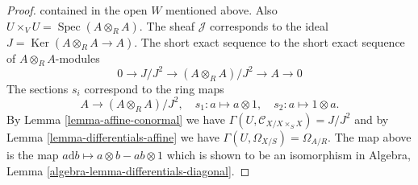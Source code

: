 \documentclass[10pt,a4paper]{amsart}
\theoremstyle{plain}
\theoremstyle{definition}
\theoremstyle{remark}
\numberwithin{equation}{subsection}
\def\Spec{\mathop{\mathrm{Spec}}}
\def\Ker{\mathop{\mathrm{Ker}}}
\begin{document}
\begin{proof}
contained in the open $W$ mentioned above. Also
$U \times_V U = \Spec(A \otimes_R A)$.
The sheaf $\mathcal{J}$ corresponds to the ideal
$J = \Ker(A \otimes_R A \to A)$.
The short exact sequence to the short exact sequence
of $A \otimes_R A$-modules
$$
0 \to J/J^2 \to (A \otimes_R A)/J^2 \to A \to 0
$$
The sections $s_i$ correspond to the ring maps
$$
A \longrightarrow (A \otimes_R A)/J^2,\quad
s_1 : a \mapsto a \otimes 1,\quad
s_2 : a \mapsto 1 \otimes a.
$$
By Lemma \ref{lemma-affine-conormal} we have
$\Gamma(U, \mathcal{C}_{X/X \times_S X}) = J/J^2$ and
by Lemma \ref{lemma-differentials-affine}
we have $\Gamma(U, \Omega_{X/S}) = \Omega_{A/R}$.
The map above is the map $a \text{d}b \mapsto a \otimes b - ab \otimes 1$
which is shown to be an isomorphism in
Algebra, Lemma \ref{algebra-lemma-differentials-diagonal}.
\end{proof}
\end{document}
